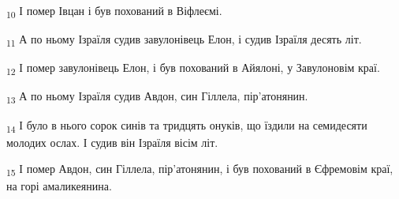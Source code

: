 \begin{tcolorbox}
\textsubscript{10} І помер Івцан і був похований в Віфлеємі.
\end{tcolorbox}
\begin{tcolorbox}
\textsubscript{11} А по ньому Ізраїля судив завулонівець Елон, і судив Ізраїля десять літ.
\end{tcolorbox}
\begin{tcolorbox}
\textsubscript{12} І помер завулонівець Елон, і був похований в Айялоні, у Завулоновім краї.
\end{tcolorbox}
\begin{tcolorbox}
\textsubscript{13} А по ньому Ізраїля судив Авдон, син Гіллела, пір'атонянин.
\end{tcolorbox}
\begin{tcolorbox}
\textsubscript{14} І було в нього сорок синів та тридцять онуків, що їздили на семидесяти молодих ослах. І судив він Ізраїля вісім літ.
\end{tcolorbox}
\begin{tcolorbox}
\textsubscript{15} І помер Авдон, син Гіллела, пір'атонянин, і був похований в Єфремовім краї, на горі амаликеянина.
\end{tcolorbox}
